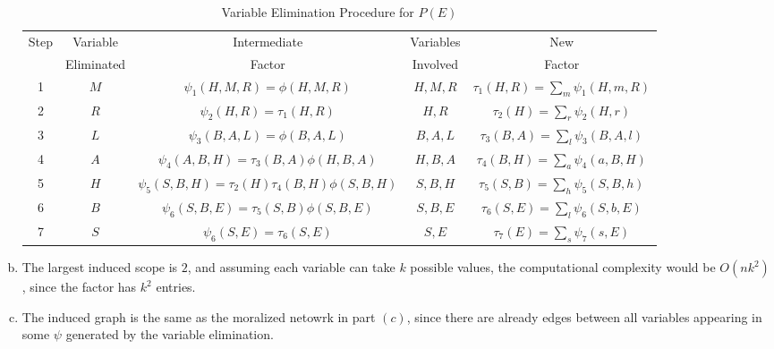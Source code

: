 \documentclass{article}
\begin{document}
\begin{enumerate}[(a)]
    \begin{table}[h!]
        \centering
        \begin{tabular}{|c|c|c|c|c|}
          \hline
          Step & Variable & Intermediate & Variables & New  \\
               & Eliminated & Factor & Involved & Factor \\
          \hline
          1 & $M$ & $\psi_1(H, M, R) = \phi(H, M, R)$ & $H, M, R$ & $\tau_1(H, R) = \sum_{m}\psi_1(H, m, R)$ \\
          2 & $R$ & $\psi_2(H, R) = \tau_1(H, R)$ & $H, R$ & $\tau_2(H) = \sum_{r}\psi_2(H, r)$ \\
          3 & $L$ & $\psi_3(B, A, L) = \phi(B, A, L)$ & $B, A, L$ & $\tau_3(B, A) = \sum_{l}\psi_3(B, A, l)$ \\
          4 & $A$ & $\psi_4(A, B, H) = \tau_3(B, A)\phi(H, B, A)$ & $H, B, A$ & $\tau_4(B, H) = \sum_{a}\psi_4(a, B, H)$ \\
          5 & $H$ & $\psi_5(S, B, H) = \tau_2(H)\tau_4(B, H)\phi(S, B, H)$ & $S, B, H$ & $\tau_5(S, B) = \sum_{h}\psi_5(S, B, h)$ \\
          6 & $B$ & $\psi_6(S, B, E) = \tau_5(S, B)\phi(S, B, E)$ & $S, B, E$ & $\tau_6(S, E) = \sum_{l}\psi_6(S, b, E)$ \\
          7 & $S$ & $\psi_6(S, E) = \tau_6(S, E)$ & $S, E$ & $\tau_7(E) = \sum_{s}\psi_7(s, E)$ \\
          \hline
        \end{tabular}
        \caption{Variable Elimination Procedure for $P(E)$}
        \label{tab:example}
      \end{table}
      \item The largest induced scope is $2$, and assuming each variable can take $k$ possible values, the computational complexity would be $O(nk^2)$, since the factor has $k^2$ entries. 
      \item The induced graph is the same as the moralized netowrk in part $(c)$, since there are already edges between all variables appearing in some $\psi$ generated by the variable elimination.

\end{enumerate}
\end{document}
